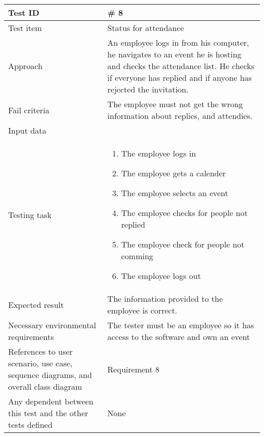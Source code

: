 \documentclass[a4paper, 10pt]{article}
\begin{document}
\begin{tabularx}{\textwidth}{ |X|X| }
\hline
\rowcolor{Gray}
Test ID & \# 8 \\ \hline
Test item & Status for attendance \\ \hline
Approach & An employee logs in from his computer, he navigates to an event he is hosting and checks the attendance list. He checks if everyone has replied and if anyone has rejected the invitation. \\ \hline
Fail criteria & The employee must not get the wrong information about replies, and attendies. \\ \hline
Input data & 
\begin*{}
	\item Username
	\item Password
    \item Select event
\end{itemize}\\ \hline
Testing task & 
\begin{enumerate}
	\item The employee logs in
	\item The employee gets a calender 
	\item The employee selects an event
    \item The employee checks for people not replied
    \item The employee check for people not comming
	\item The employee logs out
\end{enumerate} \\ \hline
Expected result & The information provided to the employee is correct. \\ \hline
Necessary environmental requirements & The tester must be an employee so it has access to the software and own an event \\ \hline
References to user scenario, use case, sequence diagrams, and overall class diagram & Requirement 8 \\ \hline
Any dependent between this test and the other tests defined & None  \\ \hline


\end{tabularx}
\end{document}
